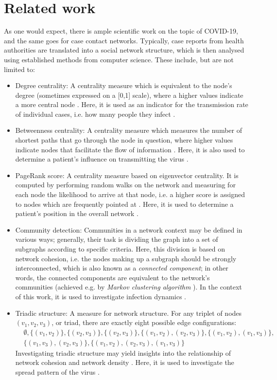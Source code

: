 \documentclass{article}
\begin{document}
	\section{Related work}
	\label{sec:Related_work}
	As one would expect, there is ample scientific work on the topic of COVID-19, and the same goes for case contact networks. Typically, case reports from health authorities are translated into a social network structure, which is then analysed using established methods from computer science. These include, but are not limited to:
	\begin{itemize}
		\item Degree centrality: A centrality measure which is equivalent to the node's degree (sometimes expressed on a [0,1] scale), where a higher values indicate a more central node \cite{golbeck}. Here, it is used as an indicator for the transmission rate of individual cases, i.e. how many people they infect \cite{hainan_publication,shanxi_publication}.
		\item Betweenness centrality: A centrality measure which measures the number of shortest paths that go through the node in question, where higher values indicate nodes that facilitate the flow of information \cite{golbeck}. Here, it is also used to determine a patient's influence on transmitting the virus \cite{hainan_publication}.
		\item PageRank score: A centrality measure based on eigenvector centrality. It is computed by performing random walks on the network and measuring for each node the likelihood to arrive at that node, i.e. a higher score is assigned to nodes which are frequently pointed at \cite{gleich_pagerank}. Here, it is used to determine a patient's position in the overall network \cite{hainan_publication,shanxi_publication}.
		\item Community detection: Communities in a network context may be defined in various ways; generally, their task is dividing the graph into a set of subgraphs according to specific criteria. Here, this division is based on network cohesion, i.e. the nodes making up a subgraph should be strongly interconnected, which is also known as a \emph{connected component}; in other words, the connected components are equivalent to the network's communities (achieved e.g. by \emph{Markov clustering algorithm} \cite{community_detection,markov_clustering}). In the context of this work, it is used to investigate infection dynamics \cite{hainan_publication}.
		\item Triadic structure: A measure for network structure. For any triplet of nodes $(v_1,v_2,v_3)$, or triad, there are exactly eight possible edge configurations: 
		\begin{align*}
			&\emptyset,\{(v_1,v_2)\},\{(v_2,v_3)\},\{(v_2,v_3)\},\{(v_1,v_2),(v_2,v_3)\},\{(v_1,v_2),(v_1,v_3)\},\\ &\{(v_1,v_3),(v_2,v_3)\},\{(v_1,v_2),(v_2,v_3),(v_1,v_3)\}
		\end{align*}
		Investigating triadic structure may yield insights into the relationship of network cohesion and network density \cite{triadic_effects}. Here, it is used to investigate the spread pattern of the virus \cite{shanxi_data}.
	\end{itemize}
	
\end{document}
